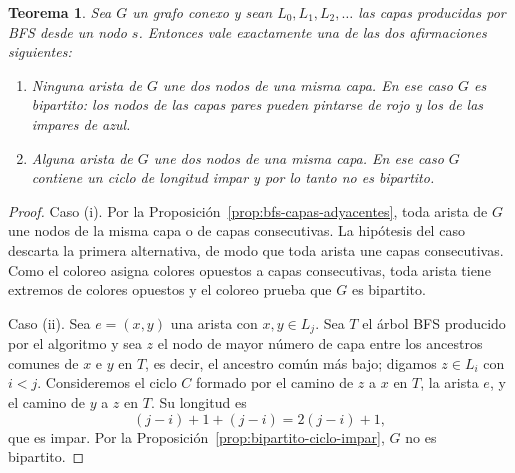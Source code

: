 \documentclass[12pt, spanish, oneside, openany]{book}
\theoremstyle{uprightplain}
\newtheorem{teorema}{Teorema}[section]
\theoremstyle{definition}
\theoremstyle{remark}
\theoremstyle{definition}
\begin{document}
\begin{teorema}
\label{teo:bipartito}
Sea $G$ un grafo conexo y sean $L_0,L_1,L_2,\dots$ las capas producidas por BFS desde un nodo $s$. Entonces vale exactamente una de las dos afirmaciones siguientes:
\begin{enumerate}[label=(\roman*)]
    \item Ninguna arista de $G$ une dos nodos de una misma capa. En ese caso $G$ es bipartito: los nodos de las capas pares pueden pintarse de rojo y los de las impares de azul.
    \item Alguna arista de $G$ une dos nodos de una misma capa. En ese caso $G$ contiene un ciclo de longitud impar y por lo tanto no es bipartito.
\end{enumerate}
\end{teorema}
\begin{proof}
Caso (i). Por la Proposición~\ref{prop:bfs-capas-adyacentes}, toda arista de $G$ une nodos de la misma capa o de capas consecutivas. La hipótesis del caso descarta la primera alternativa, de modo que toda arista une capas consecutivas. Como el coloreo asigna colores opuestos a capas consecutivas, toda arista tiene extremos de colores opuestos y el coloreo prueba que $G$ es bipartito.

Caso (ii). Sea $e=(x,y)$ una arista con $x,y\in L_j$. Sea $T$ el árbol BFS producido por el algoritmo y sea $z$ el nodo de mayor número de capa entre los ancestros comunes de $x$ e $y$ en $T$, es decir, el ancestro común más bajo; digamos $z\in L_i$ con $i<j$. Consideremos el ciclo $C$ formado por el camino de $z$ a $x$ en $T$, la arista $e$, y el camino de $y$ a $z$ en $T$. Su longitud es
\[
(j-i) + 1 + (j-i) = 2(j-i)+1,
\]
que es impar. Por la Proposición~\ref{prop:bipartito-ciclo-impar}, $G$ no es bipartito.
\end{proof}
\end{document}
